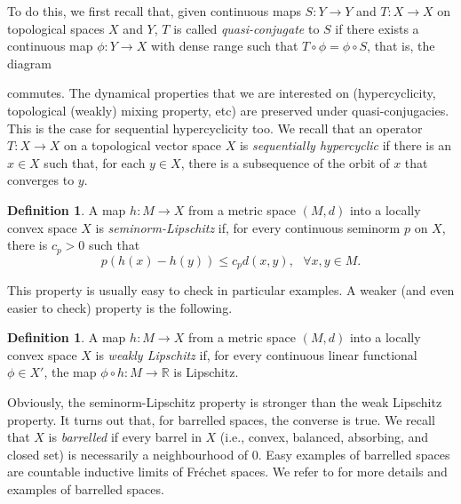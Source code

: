 \documentclass[12pt,english]{amsart}
\numberwithin{equation}{section}
\theoremstyle{plain}
\theoremstyle{definition}
\newtheorem{definition}[theorem]{Definition}
\newcommand{\R}{\mathbb{R}}
\begin{document}
To do this, we first recall that, given continuous maps $S:Y\to Y$ and $T\colon X\to X$ on topological spaces $X$ and $Y$, $T$ is called  \textit{quasi-conjugate} to $S$ if there exists a continuous map $\phi:Y\to X$ with dense range
such that $T\circ \phi = \phi\circ S$, that is, the diagram
\begin{center}
\end{center}
commutes. The dynamical properties that we are interested on (hypercyclicity, topological (weakly) mixing property, etc) are preserved under quasi-conjugacies. This is the case for sequential hypercyclicity too. We recall that an operator $T\colon X\to X$ on a topological vector space $X$ is \emph{sequentially hypercyclic} if there is an $x\in X$ such that, for each $y\in X$, there is a subsequence of the orbit of $x$ that converges to $y$. 


\begin{definition}\label{def:sL}
    A map $h:M\to X$ from a metric space $(M,d)$ into a locally convex space $X$ is \emph{seminorm-Lipschitz} if, for every continuous seminorm $p$ on $X$, there is $c_p>0$ such that 
    $$
    p(h(x)-h(y))\leq c_p d(x,y), \ \ \ \forall x,y\in M.
    $$
\end{definition}

This property is usually easy to check in particular examples. A weaker (and even easier to check) property is the following. 

\begin{definition}\label{def:wL}
    A map $h:M\to X$ from a metric space $(M,d)$ into a locally convex space $X$ is \emph{weakly Lipschitz} if, for every continuous linear functional $\phi\in X'$, the map $\phi\circ h: M\to \R$ is Lipschitz.
\end{definition}

Obviously, the seminorm-Lipschitz property is stronger than the weak Lipschitz property. It turns out that, for barrelled spaces, the converse is true. We recall that $X$ is \emph{barrelled} if every barrel in $X$ (i.e.,  convex, balanced, absorbing, and closed set) is necessarily a neighbourhood of $0$. Easy examples of barrelled spaces are countable inductive limits of Fréchet spaces. We refer to \cite{BPC} for more details and examples of barrelled spaces. 
\end{document}
